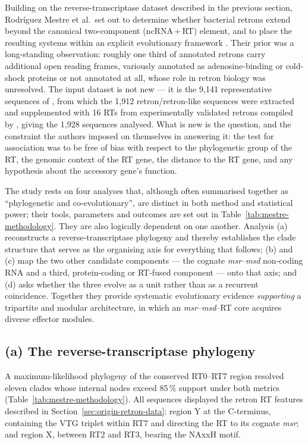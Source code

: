 Building on the reverse-transcriptase dataset described in the previous section, Rodríguez Mestre
et al.\ set out to determine whether bacterial retrons extend beyond the canonical two-component
(ncRNA\,+\,RT) element, and to place the resulting systems within an explicit evolutionary
framework \cite{mestre2020}. Their prior was a long-standing observation: roughly one third of
annotated retrons carry additional open reading frames, variously annotated as adenosine-binding
or cold-shock proteins or not annotated at all, whose role in retron biology was unresolved. The
input dataset is not new --- it is the 9{,}141 representative sequences of \cite{toro2019}, from
which the 1{,}912 retron/retron-like sequences were extracted and supplemented with 16 RTs from
experimentally validated retrons compiled by \cite{simon2019}, giving the 1{,}928 sequences
analysed. What is new is the question, and the constraint the authors imposed on themselves in
answering it: the test for association was to be free of bias with respect to the phylogenetic
group of the RT, the genomic context of the RT gene, the distance to the RT gene, and any
hypothesis about the accessory gene's function.
 

The study rests on four analyses that, although often summarised together as ``phylogenetic and
co-evolutionary'', are distinct in both method and statistical power; their tools, parameters and
outcomes are set out in Table~\ref{tab:mestre-methodology}. They are also logically dependent on
one another. Analysis (a) reconstructs a reverse-transcriptase phylogeny and thereby establishes
the clade structure that serves as the organising axis for everything that follows; (b) and (c)
map the two other candidate components --- the cognate \textit{msr}--\textit{msd} non-coding RNA
and a third, protein-coding or RT-fused component --- onto that axis; and (d) asks whether the
three evolve as a unit rather than as a recurrent coincidence. Together they provide systematic
evolutionary evidence \textit{supporting} a tripartite and modular architecture, in which an
\textit{msr}--\textit{msd}--RT core acquires diverse effector modules.
 
\subsection{(a) The reverse-transcriptase phylogeny}
 
A maximum-likelihood phylogeny of the conserved RT0--RT7 region resolved eleven clades whose
internal nodes exceed 85\,\% support under both metrics (Table~\ref{tab:mestre-methodology}). All
sequences displayed the retron RT features described in Section~\ref{sec:origin-retron-data}:
region Y at the C-terminus, containing the VTG triplet within RT7 and directing the RT to its
cognate \textit{msr}; and region X, between RT2 and RT3, bearing the NAxxH motif.
 
